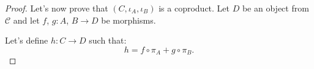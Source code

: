 \documentclass{beamer}
\begin{document}
\begin{frame}
    \begin{proof}
        Let's now prove that $(C, \iota_A, \iota_B)$ is a coproduct. Let
        $D$ be an object from $\mathcal{C}$ and let $f$, $g : A$, $B \to D$
        be morphisms. \medskip

        Let's define $h : C \to D$ such that:
        \[
            h = f \circ \pi_A + g \circ \pi_B. 
        \] 
    \end{proof}
\end{frame}
\end{document}
